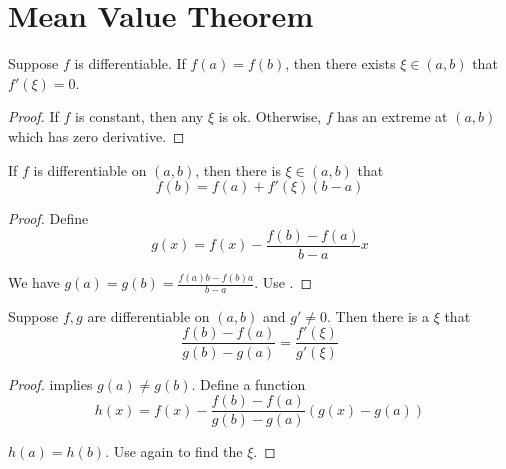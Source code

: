 \section{Mean Value Theorem}

\begin{theorem}\label{rolle_theorem}
    Suppose $f$ is differentiable. If $f(a) = f(b)$, then there exists $\xi \in (a,b)$ that $f'(\xi) = 0$.
\end{theorem}
\begin{proof}
    If $f$ is constant, then any $\xi$ is ok. Otherwise, $f$ has an extreme at $(a,b)$ which has zero derivative.
\end{proof}

\begin{theorem}
    If $f$ is differentiable on $(a,b)$, then there is $\xi \in (a,b)$ that
    \begin{equation}
        f(b) = f(a) + f'(\xi)(b-a)
    \end{equation}
\end{theorem}
\begin{proof}
    Define 
    \begin{equation}
        g(x) = f(x) - \frac{f(b) - f(a)}{b-a}x
    \end{equation}
    
    We have $g(a) = g(b) = \frac{f(a)b - f(b) a}{b-a}$. Use .
\end{proof}


\begin{theorem}
    Suppose $f,g$ are differentiable on $(a,b)$ and $g' \neq 0$. Then there is a $\xi$ that
    \begin{equation}
        \frac{f(b) - f(a)}{g(b) - g(a)} = \frac{f'(\xi)}{g'(\xi)}
    \end{equation}
\end{theorem}
\begin{proof}
     implies $g(a) \neq g(b)$. Define a function 
    \begin{equation}
        h(x) = f(x) - \frac{f(b) - f(a)}{g(b) - g(a)}(g(x) - g(a))
    \end{equation}
    
    $h(a) = h(b)$. Use  again to find the $\xi$.
\end{proof}

